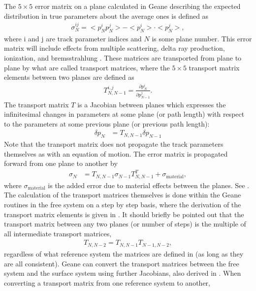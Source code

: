The $5 \times 5$ error matrix on a plane calculated in Geane describing the expected distribution in true parameters about the average ones is defined as
    \begin{align} \label{eq:errormatrix}
        \sigma_{N}^{ij} = <p_{N}^{i}p_{N}^{j}> - <p_{N}^{i}> \cdot <p_{N}^{j}>,
    \end{align} 
where i and j are track parameter indices and $N$ is some plane number. This error matrix will include effects from multiple scattering, delta ray production, ionization, and bremsstrahlung \cite{geanemanual,Lavezzi,energyloss}. These matrices are transported from plane to plane by what are called transport matrices, where the $5 \times 5$ transport matrix elements between two planes are defined as 
    \begin{align} \label{eq:transportmatrix}
        T_{N,N-1}^{i,j} = \frac{\partial p^{i}_{N}}{\partial p^{j}_{N-1}}.
    \end{align}
The transport matrix $T$ is a Jacobian between planes which expresses the infinitesimal changes in parameters at some plane (or path length) with respect to the parameters at some previous plane (or previous path length):
    \begin{align} \label{eq:parametertransport}
        \delta p_{N} &= T_{N,N-1} \delta p_{N-1}
    \end{align}
Note that the transport matrix does not propagate the track parameters themselves as with an equation of motion. The error matrix is propagated forward from one plane to another by
    \begin{align} \label{eq:errortransport}
        \sigma_{N} &= T_{N,N-1} \sigma_{N-1} T_{N,N-1}^{T} + \sigma_{\text{material}},
    \end{align}
where $\sigma_{\text{material}}$ is the added error due to material effects between the planes. See . The calculation of the transport matrices themselves is done within the Geane routines in the free system on a step by step basis, where the derivation of the transport matrix elements is given in . It should briefly be pointed out that the transport matrix between any two planes (or number of steps) is the multiple of all intermediate transport matrices,
    \begin{align}
        T_{N,N-2} = T_{N,N-1} T_{N-1,N-2},
    \end{align}
regardless of what reference system the matrices are defined in (as long as they are all consistent). Geane can convert the transport matrices between the free system and the surface system using further Jacobians, also derived in . When converting a transport matrix from one reference system to another,
